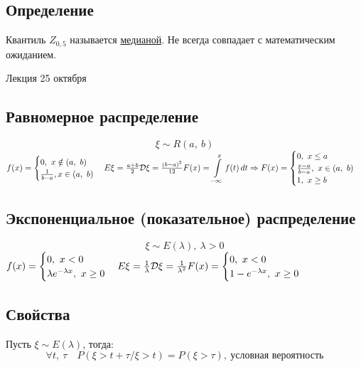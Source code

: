 \documentclass[12pt, a4paper]{article}
\begin{document}
    \subsection*{Определение}
    
    Квантиль $Z_{0,5}$ называется \underline{медианой}. Не всегда совпадает с математическим ожиданием.
    
    \begin{center}
        Лекция 25 октября
    \end{center}
    \subsection*{Равномерное распределение}
    \[\xi\sim R(a,\ b)\]
    $f(x) = \begin{cases}
        0,\ x\notin (a,\ b)\\
        \frac{1}{b - a}, x\in(a,\ b)
    \end{cases}\\
    E\xi = \frac{a + b}{2}\\
    \mathcal{D}\xi = \frac{(b - a)^2}{12}\\
    F(x) = \displaystyle \int\limits_{-\infty}^{x} f(t)\, dt\Rightarrow F(x) = \begin{cases}
        0,\ x\leq a\\
        \frac{x - a}{b - a},\ x\in (a,\ b)\\
        1,\ x\geq b
    \end{cases}$
    \subsection*{Экспоненциальное (показательное) распределение}
    \[\xi \sim E(\lambda),\ \lambda > 0\]
    $f(x) = \begin{cases}
        0,\ x < 0\\
        \lambda e^{-\lambda x},\ x\geq 0
    \end{cases}\\
    E\xi = \frac{1}{\lambda}\\
    \mathcal{D}\xi = \frac{1}{\lambda^2}\\
    F(x) = \begin{cases}
        0,\ x < 0\\
        1 - e^{-\lambda x},\ x\geq 0
    \end{cases}$
    \subsection*{Свойства}
    Пусть $\xi \sim E(\lambda)$, тогда:
    \[\forall t,\ \tau\quad P(\xi > t + \tau / \xi > t) = P(\xi > \tau),\ \text{условная вероятность}\]
\end{document}
